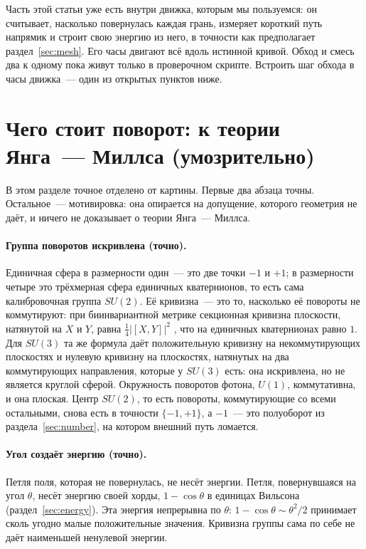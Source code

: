\begin{plain}
Часть этой статьи уже есть внутри движка, которым мы пользуемся: он считывает, насколько повернулась
каждая грань, измеряет короткий путь напрямик и строит свою энергию из него, в точности как
предполагает раздел~\ref{sec:mesh}. Его часы двигают всё вдоль истинной кривой. Обход и
смесь два к одному пока живут только в проверочном скрипте. Встроить шаг обхода в
часы движка~--- один из открытых пунктов ниже.
\end{plain}

\section{Чего стоит поворот: к теории Янга~--- Миллса (умозрительно)}\label{sec:ym}

В этом разделе точное отделено от картины. Первые два абзаца точны. Остальное~--- мотивировка:
она опирается на допущение, которого геометрия не даёт, и ничего не доказывает о теории
Янга~--- Миллса.

\paragraph{Группа поворотов искривлена (точно).} Единичная сфера в размерности один~--- это две точки $-1$ и $+1$;
в размерности четыре это трёхмерная сфера единичных кватернионов, то есть сама калибровочная группа $SU(2)$. Её кривизна~---
это то, насколько её повороты не коммутируют: при биинвариантной метрике секционная кривизна плоскости, натянутой на $X$ и
$Y$, равна $\tfrac14|[X,Y]|^2$ \cite{milnor}, что на единичных кватернионах равно $1$. Для $SU(3)$ та же формула даёт
положительную кривизну на некоммутирующих плоскостях и нулевую кривизну на плоскостях, натянутых на два коммутирующих
направления, которые у $SU(3)$ есть: она искривлена, но не является круглой сферой. Окружность поворотов фотона,
$U(1)$, коммутативна, и она плоская. Центр $SU(2)$, то есть повороты, коммутирующие со всеми
остальными, снова есть в точности $\{-1,+1\}$, а $-1$~--- это полуоборот из раздела~\ref{sec:number},
на котором внешний путь ломается.

\paragraph{Угол создаёт энергию (точно).} Петля поля, которая не повернулась, не несёт энергии. Петля,
повернувшаяся на угол $\theta$, несёт энергию своей хорды, $1-\cos\theta$ в единицах Вильсона
(раздел~\ref{sec:energy}). Эта энергия непрерывна по $\theta$: $1-\cos\theta\sim\theta^2/2$ принимает сколь угодно малые
положительные значения. Кривизна группы сама по себе не даёт наименьшей ненулевой энергии.


